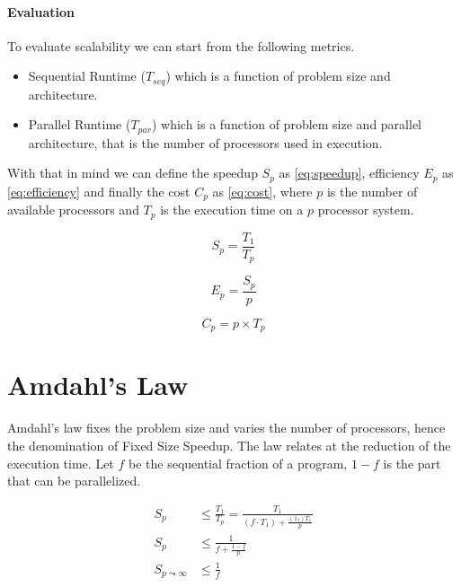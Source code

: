 \paragraph{Evaluation}

To evaluate scalability we can start from the following metrics.

\begin{itemize}
    \item Sequential Runtime ($T_{seq}$) which is a function of problem size and architecture.
    \item Parallel Runtime ($T_{par}$) which is a function of problem size and parallel architecture, that is the number of processors used in execution.
\end{itemize}

With that in mind we can define the speedup $S_p$ as \autoref{eq:speedup},
efficiency $E_p$ as \autoref{eq:efficiency}
and finally the cost $C_p$ as \autoref{eq:cost},
where $p$ is the number of available processors and $T_p$ is the execution time on a $p$ processor system.

\begin{equation}\label{eq:speedup}
    S_p = \frac{T_1}{T_p}
\end{equation}

\begin{equation}\label{eq:efficiency}
    E_p = \frac{S_p}{p}
\end{equation}

\begin{equation}\label{eq:cost}
    C_p = p \times T_p
\end{equation}

\section{Amdahl's Law}

Amdahl's law fixes the problem size and varies the number of processors,
hence the denomination of Fixed Size Speedup.
The law relates at the reduction of the execution time.
Let $f$ be the sequential fraction of a program, $1-f$ is the part that can be parallelized.

\begin{equation}
    \begin{split}
        S_p & \le \frac{T_1}{T_p} = \frac{T_1}{(f \cdot T_1) + \frac{(1_f)T_1}{p}}\\
        S_p & \le \frac{1}{f + \frac{1-f}{p}}\\
        S_{p \leadsto \infty} & \le \frac{1}{f}
    \end{split}
\end{equation}

